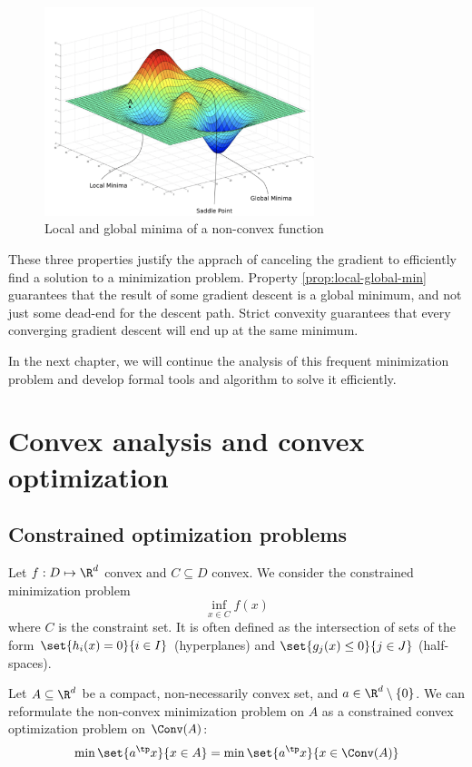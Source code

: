 \documentclass{../cs-classes/cs-classes}
\begin{document}
\begin{figure}[H]
    \centering
    \captionsetup{justification=centering}
    \includegraphics[width=0.7\textwidth]{images/local-minimum.png}
    \caption{Local and global minima of a non-convex function}
\end{figure}
These three properties justify the apprach of canceling the gradient to efficiently find a solution to a minimization problem. Property \ref{prop:local-global-min} guarantees that the result of some gradient descent is a global minimum, and not just some dead-end for the descent path. Strict convexity guarantees that every converging gradient descent will end up at the same minimum.

In the next chapter, we will continue the analysis of this frequent minimization problem and develop formal tools and algorithm to solve it efficiently.

\section{Convex analysis and convex optimization}
\subsection{Constrained optimization problems}
Let $f:D\mapsto\R^d$ convex and $C\subseteq D$ convex. We consider the constrained minimization problem
\begin{equation*}
    \inf_{x\in C}f(x)
\end{equation*}
where $C$ is the constraint set. It is often  defined as the intersection of sets of the form $\set{h_i(x)=0}{i\in I}$ (hyperplanes) and $\set{g_j(x)\leq0}{j\in J}$ (half-spaces).

\begin{example}
    Let $A\subseteq\R^d$ be a compact, non-necessarily convex set, and $a\in\R^d\setminus\{0\}$. We can reformulate the non-convex minimization problem on $A$ as a constrained convex optimization problem on $\Conv(A)$:
    \begin{equation*}
        \min\set{a^\tp x}{x\in A} = \min\set{a^\tp x}{x\in\Conv(A)}
    \end{equation*}    
\end{example}
\end{document}
